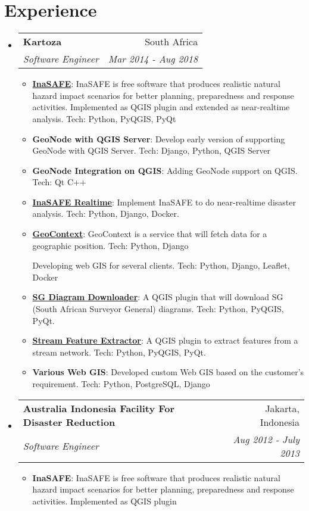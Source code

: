 \documentclass[letterpaper,11pt]{article}
\makeatletter
\newcommand{\resumeItem}[2]{
  \item\small{
    \textbf{#1}{: #2 \vspace{-2pt}}
  }
}
\newcommand{\resumeSubheading}[4]{
  \vspace{-1pt}\item
    \begin{tabular*}{0.97\textwidth}[t]{l@{\extracolsep{\fill}}r}
      \textbf{#1} & #2 \\
      \textit{\small#3} & \textit{\small #4} \\
    \end{tabular*}\vspace{-5pt}
}
\newcommand{\resumeSubHeadingListStart}{\begin{itemize}[leftmargin=*]}
\newcommand{\resumeSubHeadingListEnd}{\end{itemize}}
\newcommand{\resumeItemListStart}{\begin{itemize}}
\newcommand{\resumeItemListEnd}{\end{itemize}\vspace{-5pt}}
\makeatother
\begin{document}
\section{Experience}
  \resumeSubHeadingListStart
    \resumeSubheading
      {Kartoza}{South Africa}
      {Software Engineer}{Mar 2014 - Aug 2018}
      \resumeItemListStart
        \resumeItem{\href{http://inasafe.org/}{InaSAFE}}
          {InaSAFE is free software that produces realistic natural hazard impact scenarios for better planning, preparedness and response activities. Implemented as QGIS plugin and extended as near-realtime analysis. Tech: Python, PyQGIS, PyQt}
        \resumeItem{GeoNode with QGIS Server}
          {Develop early version of supporting GeoNode with QGIS Server. Tech: Django, Python, QGIS Server}
        \resumeItem{GeoNode Integration on QGIS}
          {Adding GeoNode support on QGIS. Tech: Qt C++}
        \resumeItem{\href{https://github.com/inasafe/inasafe-realtime}{InaSAFE Realtime}}
          {Implement InaSAFE to do near-realtime disaster analysis. Tech: Python, Django, Docker.}
        \resumeItem{\href{https://github.com/kartoza/geocontext}{GeoContext}}
          {GeoContext is a service that will fetch data for a geographic position. Tech: Python, Django}
          {Developing web GIS for several clients. Tech: Python, Django, Leaflet, Docker}
        \resumeItem{\href{http://plugins.qgis.org/plugins/SGDiagramDownloader/}{SG Diagram Downloader}}
          {A QGIS plugin that will download SG (South African Surveyor General) diagrams. Tech: Python, PyQGIS, PyQt.}
        \resumeItem{\href{http://plugins.qgis.org/plugins/StreamFeatureExtractor/}{Stream Feature Extractor}}
          {A QGIS plugin to extract features from a stream network. Tech: Python, PyQGIS, PyQt.}
        \resumeItem{Various Web GIS}
          {Developed custom Web GIS based on the customer's requirement. Tech: Python, PostgreSQL, Django}
      \resumeItemListEnd

    \resumeSubheading
      {Australia Indonesia Facility For Disaster Reduction}{Jakarta, Indonesia}
      {Software Engineer}{Aug 2012 - July 2013}
      \resumeItemListStart
        \resumeItem{InaSAFE}
          {InaSAFE is free software that produces realistic natural hazard impact scenarios for better planning, preparedness and response activities. Implemented as QGIS plugin}
      \resumeItemListEnd

  \resumeSubHeadingListEnd


\end{document}
